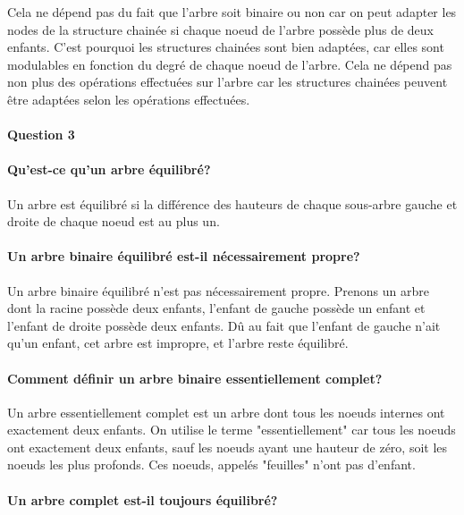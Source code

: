 \documentclass[a4paper]{article}
\begin{document}
Cela ne dépend pas du fait que l'arbre soit binaire ou non car on peut adapter les nodes de la structure chainée si chaque noeud de l'arbre possède plus de deux enfants. C'est pourquoi les structures chainées sont bien adaptées, car elles sont modulables en fonction du degré de chaque noeud de l'arbre. Cela ne dépend pas non plus des opérations effectuées sur l'arbre car les structures chainées peuvent être adaptées selon les opérations effectuées.

\paragraph{Question 3}

\paragraph{Qu'est-ce qu'un arbre équilibré?}


Un arbre est équilibré si la différence des hauteurs de chaque sous-arbre gauche et droite de chaque noeud est au plus un.

\paragraph{Un arbre binaire équilibré est-il nécessairement propre?}

Un arbre binaire équilibré n'est pas nécessairement propre. Prenons un arbre dont la racine possède deux enfants, l'enfant de gauche possède un enfant et l'enfant de droite possède deux enfants. Dû au fait que l'enfant de gauche n'ait qu'un enfant, cet arbre est impropre, et l'arbre reste équilibré. \\

\paragraph{Comment définir un arbre binaire essentiellement complet?}

Un arbre essentiellement complet est un arbre dont tous les noeuds internes ont exactement deux enfants. On utilise le terme "essentiellement" car tous les noeuds ont exactement deux enfants, sauf les noeuds ayant une hauteur de zéro, soit les noeuds les plus profonds. Ces noeuds, appelés "feuilles" n'ont pas d'enfant. \\

\paragraph{Un arbre complet est-il toujours équilibré?}
\end{document}
